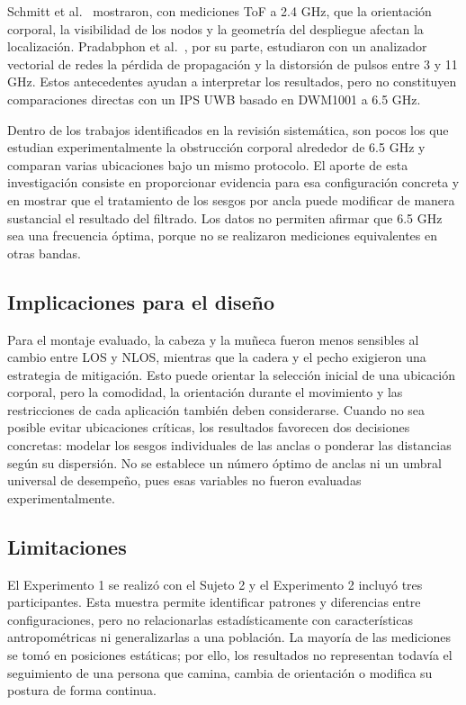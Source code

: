 Schmitt et al.~\cite{Schimtt2019} mostraron, con mediciones ToF a 2.4 GHz, que la orientación corporal, la visibilidad de los nodos y la geometría del despliegue afectan la localización. Pradabphon et al.~\cite{Pradabphon2019}, por su parte, estudiaron con un analizador vectorial de redes la pérdida de propagación y la distorsión de pulsos entre 3 y 11 GHz. Estos antecedentes ayudan a interpretar los resultados, pero no constituyen comparaciones directas con un IPS UWB basado en DWM1001 a 6.5 GHz.

Dentro de los trabajos identificados en la revisión sistemática, son pocos los que estudian experimentalmente la obstrucción corporal alrededor de 6.5 GHz y comparan varias ubicaciones bajo un mismo protocolo. El aporte de esta investigación consiste en proporcionar evidencia para esa configuración concreta y en mostrar que el tratamiento de los sesgos por ancla puede modificar de manera sustancial el resultado del filtrado. Los datos no permiten afirmar que 6.5 GHz sea una frecuencia óptima, porque no se realizaron mediciones equivalentes en otras bandas.

\subsection{Implicaciones para el diseño}
\label{sec:implicaciones_practicas}

Para el montaje evaluado, la cabeza y la muñeca fueron menos sensibles al cambio entre LOS y NLOS, mientras que la cadera y el pecho exigieron una estrategia de mitigación. Esto puede orientar la selección inicial de una ubicación corporal, pero la comodidad, la orientación durante el movimiento y las restricciones de cada aplicación también deben considerarse. Cuando no sea posible evitar ubicaciones críticas, los resultados favorecen dos decisiones concretas: modelar los sesgos individuales de las anclas o ponderar las distancias según su dispersión. No se establece un número óptimo de anclas ni un umbral universal de desempeño, pues esas variables no fueron evaluadas experimentalmente.

\subsection{Limitaciones}
\label{sec:limitaciones}

El Experimento 1 se realizó con el Sujeto 2 y el Experimento 2 incluyó tres participantes. Esta muestra permite identificar patrones y diferencias entre configuraciones, pero no relacionarlas estadísticamente con características antropométricas ni generalizarlas a una población. La mayoría de las mediciones se tomó en posiciones estáticas; por ello, los resultados no representan todavía el seguimiento de una persona que camina, cambia de orientación o modifica su postura de forma continua.

